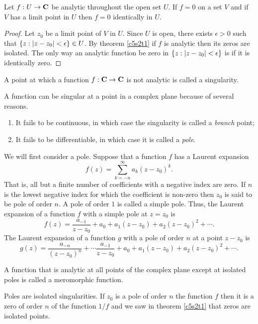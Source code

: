 \begin{cor}\label{c5s2c1}
Let $f:U \rightarrow \mathbf{C}$ be analytic throughout the open set $U$. If $f=0$
on a set $V$ and if $V$ has a limit point in $U$ then $f = 0$ identically in
$U$.
\end{cor}
\begin{proof}
Let $z_0$ be a limit point of $V$ in $U$. Since $U$ is open, there exists
$\epsilon > 0$ such that $\{z : \left\vert{z - z_0}\right\vert < \epsilon\} \in U$. By theorem
\ref{c5s2t1} if $f$ is analytic then its zeros are isolated. The only way
an analytic function be zero in $\{z : \left\vert{z - z_0}\right\vert < \epsilon\}$ is if it is
identically zero.
\end{proof}

\begin{defn}\label{c5s2d2}
A point at which a function $f: \mathbf{C} \rightarrow \mathbf{C}$ is not analytic is 
called a singularity.
\end{defn}

A function can be singular at a point in a complex plane because of several
reasons.
\begin{enumerate}
\item It fails to be continuous, in which case the singularity is called a 
\emph{branch} point;
\item It fails to be differentiable, in which case it is called a \emph{pole}.
\end{enumerate}

We will first consider a pole. Suppose that a function $f$ has a Laurent
expansion
\[
f(z) = \sum_{k=-n}^\infty a_k (z - z_0)^k.
\]
That is, all but a finite number of coefficients with a negative index are zero.
If $n$ is the lowest negative index for which the coefficient is non-zero then
$z_0$ is said to be pole of order $n$. A pole of order $1$ is called a simple
pole. Thus, the Laurent expansion of a function $f$ with a simple pole at 
$z = z_0$ is
\[
f(z) = \frac{a_{-1}}{z - z_0} + a_0 + a_1(z - z_0) + a_2(z - z_0)^2 + \cdots.
\]
The Laurent expansion of a function $g$ with a pole of order $n$ at a point
$z - z_0$ is
\[
g(z) = \frac{a_{-n}}{(z - z_0)^n} + \cdots \frac{a_{-1}}{z - z_0} + a_0 + 
a_1(z - z_0) + a_2(z - z_0)^2 + \cdots.
\]

\begin{defn}\label{c5s2d3}
A function that is analytic at all points of the complex plane except at 
isolated poles is called a meromorphic function.
\end{defn}

Poles are isolated singularities. If $z_0$ is a pole of order $n$ the function 
$f$ then it is a zero of order $n$ of the function $1/f$ and we saw in theorem
\ref{c5s2t1} that zeros are isolated points.

